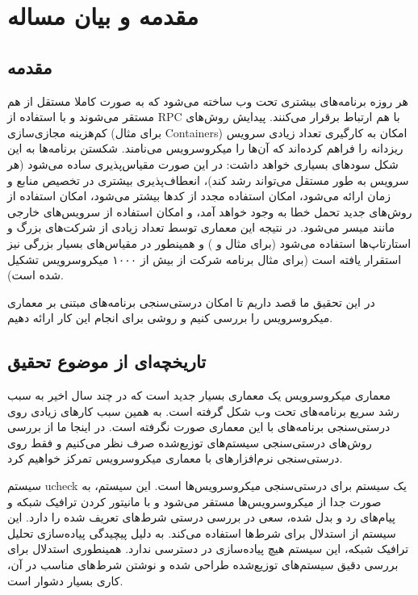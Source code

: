 
\chapter{مقدمه و بیان مساله}
\section{مقدمه}
هر روزه برنامه‌های بیشتری تحت وب ساخته می‌شود که به صورت کاملا مستقل از هم مستقر می‌شوند و با استفاده از
\gls{RPC}
با هم ارتباط برقرار می‌کنند. پیدایش روش‌های کم‌هزینه مجازی‌سازی (برای مثال
\glspl{Container})
امکان به کارگیری تعداد زیادی سرویس ریزدانه را فراهم کرده‌اند که آن‌ها را میکروسرویس می‌نامند. شکستن برنامه‌ها به این شکل سودهای بسیاری خواهد داشت:‌ در این صورت مقیاس‌پذیری ساده می‌شود (هر سرویس به طور مستقل می‌تواند رشد کند)،‌ انعطاف‌پذیری بیشتری در تخصیص منابع و زمان ارائه می‌شود، امکان استفاده مجدد از کدها بیشتر می‌شود، امکان استفاده از روش‌های جدید تحمل خطا به وجود خواهد آمد، و امکان استفاده از سرویس‌های خارجی مانند
میسر می‌شود. در نتیجه این معماری توسط تعداد زیادی از شرکت‌های بزرگ و استارتاپ‌ها استفاده می‌شود (برای مثال
 \cite{toddhoff2020}
و
 \cite{tonymauro2020})
و همینطور در مقیاس‌های بسیار بزرگی نیز استقرار یافته است (برای مثال برنامه شرکت
 \cite{toddhoff2020}
از بیش از ۱۰۰۰ میکروسرویس تشکیل شده است).

در این تحقیق ما قصد داریم تا امکان درستی‌سنجی برنامه‌های مبتنی بر معماری میکروسرویس را بررسی کنیم و روشی برای انجام این کار ارائه دهیم.

\section{تاریخچه‌ای از موضوع تحقیق}
معماری میکروسرویس یک معماری بسیار جدید است که در چند سال اخیر به سبب رشد سریع برنامه‌های تحت وب شکل گرفته است. به همین سبب کارهای زیادی روی درستی‌سنجی برنامه‌های با این معماری صورت نگرفته است. در اینجا ما از بررسی روش‌های درستی‌سنجی سیستم‌های توزیع‌شده صرف نظر می‌کنیم و فقط روی درستی‌سنجی نرم‌افزارهای با معماری میکروسرویس تمرکز خواهیم کرد.

سیستم
ucheck \cite{panda2017verification}
یک سیستم برای درستی‌سنجی میکروسرویس‌ها است. این سیستم،‌ به صورت جدا از میکروسرویس‌ها مستقر می‌شود و با مانیتور کردن ترافیک شبکه و پیام‌های رد و بدل شده، سعی در بررسی درستی شرط‌های تعریف شده را دارد. این سیستم از استدلال
 \cite{Jones83}
برای شرط‌ها استفاده می‌کند. به دلیل پیچیدگی پیاده‌سازی تحلیل ترافیک شبکه، این سیستم هیچ پیاده‌سازی در دسترسی ندارد. همینطوری استدلال
برای بررسی دقیق سیستم‌های توزیع‌شده طراحی شده و نوشتن شرط‌های مناسب در آن، کاری بسیار دشوار است.


